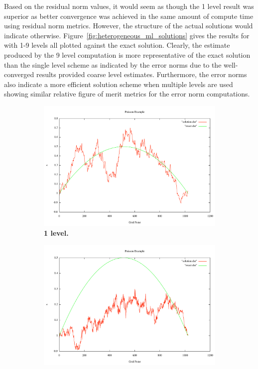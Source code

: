 \documentclass[note]{TechNote}
\begin{document}
Based on the residual norm values, it would seem as though the 1 level
result was superior as better convergence was achieved in the same
amount of compute time using residual norm metrics. However, the
structure of the actual solutions would indicate
otherwise. Figure~\ref{fig:heterogeneous_ml_solutions} gives the
results for with 1-9 levels all plotted against the exact
solution. Clearly, the estimate produced by the 9 level computation is
more representative of the exact solution than the single level scheme
as indicated by the error norms due to the well-converged results
provided coarse level estimates. Furthermore, the error norms also
indicate a more efficient solution scheme when multiple levels are
used showing similar relative figure of merit metrics for the error
norm computations.

\begin{figure}[h!]
  \centering
  \begin{subfigure}[b]{0.3\textwidth}
    \includegraphics[width=\textwidth]{7_sec_1_level.pdf}
    \caption{\textbf{1 level.}}
  \end{subfigure}
  \begin{subfigure}[b]{0.3\textwidth}
    \includegraphics[width=\textwidth]{7_sec_2_level.pdf}

\end{subfigure}
\end{figure}
\end{document}
